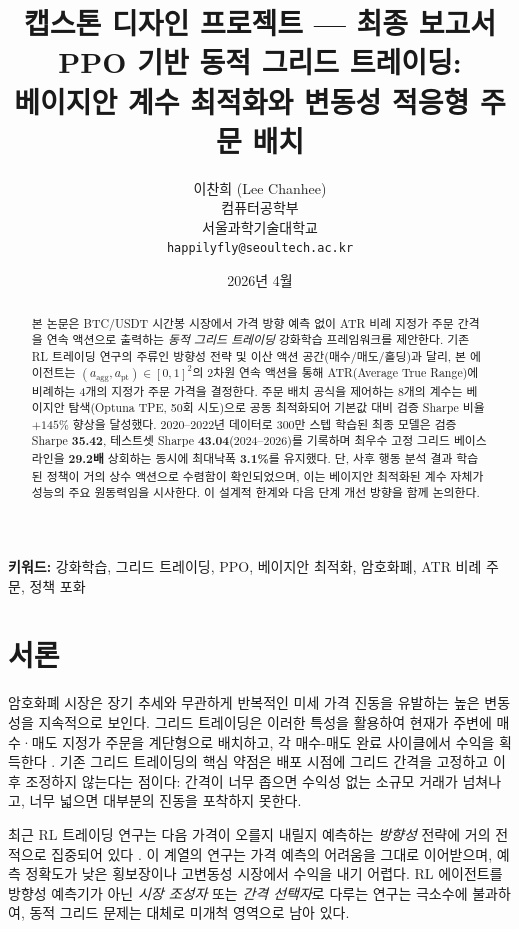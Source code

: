 \documentclass[11pt, a4paper]{article}
\title{
    \vspace{-1cm}
    {\large 캡스톤 디자인 프로젝트 — 최종 보고서}\\[0.8em]
    \textbf{PPO 기반 동적 그리드 트레이딩:\\
    베이지안 계수 최적화와 변동성 적응형 주문 배치}
}
\author{
    이찬희 (Lee Chanhee)\\
    컴퓨터공학부\\
    서울과학기술대학교\\
    \texttt{happilyfly@seoultech.ac.kr}
}
\date{2026년 4월}
\begin{document}
\maketitle
\thispagestyle{empty}

\begin{abstract}
본 논문은 BTC/USDT 시간봉 시장에서 가격 방향 예측 없이 ATR 비례 지정가 주문 간격을
연속 액션으로 출력하는 \emph{동적 그리드 트레이딩} 강화학습 프레임워크를 제안한다.
기존 RL 트레이딩 연구의 주류인 방향성 전략 및 이산 액션 공간(매수/매도/홀딩)과 달리,
본 에이전트는 $(a_\text{agg}, a_\text{pt}) \in [0,1]^2$의 2차원 연속 액션을 통해
ATR(Average True Range)에 비례하는 4개의 지정가 주문 가격을 결정한다.
주문 배치 공식을 제어하는 8개의 계수는 베이지안 탐색(Optuna TPE, 50회 시도)으로
공동 최적화되어 기본값 대비 검증 Sharpe 비율 \(+145\%\) 향상을 달성했다.
2020--2022년 데이터로 300만 스텝 학습된 최종 모델은 검증 Sharpe \textbf{35.42},
테스트셋 Sharpe \textbf{43.04}(2024--2026)를 기록하며 최우수 고정 그리드 베이스라인을
\textbf{29.2배} 상회하는 동시에 최대낙폭 \textbf{3.1\%}를 유지했다.
단, 사후 행동 분석 결과 학습된 정책이 거의 상수 액션으로 수렴함이 확인되었으며,
이는 베이지안 최적화된 계수 자체가 성능의 주요 원동력임을 시사한다.
이 설계적 한계와 다음 단계 개선 방향을 함께 논의한다.
\end{abstract}

\vspace{1em}
\noindent\textbf{키워드:} 강화학습, 그리드 트레이딩, PPO, 베이지안 최적화,
암호화폐, ATR 비례 주문, 정책 포화

\newpage
\tableofcontents
\newpage

\section{서론}

암호화폐 시장은 장기 추세와 무관하게 반복적인 미세 가격 진동을 유발하는
높은 변동성을 지속적으로 보인다.
그리드 트레이딩은 이러한 특성을 활용하여 현재가 주변에 매수·매도 지정가 주문을
계단형으로 배치하고, 각 매수-매도 완료 사이클에서 수익을 획득한다
\citep{sun2023rl}.
기존 그리드 트레이딩의 핵심 약점은 배포 시점에 그리드 간격을 고정하고 이후 조정하지
않는다는 점이다: 간격이 너무 좁으면 수익성 없는 소규모 거래가 넘쳐나고,
너무 넓으면 대부분의 진동을 포착하지 못한다.

최근 RL 트레이딩 연구는 다음 가격이 오를지 내릴지 예측하는 \emph{방향성} 전략에
거의 전적으로 집중되어 있다 \citep{liu2021bitcoin, yasin2024rl, pham2025dqn}.
이 계열의 연구는 가격 예측의 어려움을 그대로 이어받으며,
예측 정확도가 낮은 횡보장이나 고변동성 시장에서 수익을 내기 어렵다.
RL 에이전트를 방향성 예측기가 아닌 \emph{시장 조성자} 또는 \emph{간격 선택자}로
다루는 연구는 극소수에 불과하여, 동적 그리드 문제는 대체로 미개척 영역으로 남아 있다.
\end{document}

